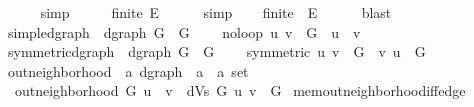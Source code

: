 \begin{isabellebody}
\ \ \ \ \isamarkupfalse%
\ simp\isanewline
\ \ \isamarkupfalse%
\ \isamarkupfalse%
\ {\isachardoublequoteopen}finite\ {\isacharquery}{\kern0pt}E{\isachardoublequoteclose}\isanewline
\ \ \ \ \isamarkupfalse%
\ simp\isanewline
\ \ \isamarkupfalse%
\ {\isachardoublequoteopen}finite\ {\isacharparenleft}{\kern0pt}{\isasymUnion}\ {\isacharquery}{\kern0pt}E{\isacharparenright}{\kern0pt}{\isachardoublequoteclose}\isanewline
\ \ \ \ \isamarkupfalse%
\ blast\isanewline
{}\isamarkupfalse%
%
\endisatagproof
{\isafoldproof}%
%
\isadelimproof
\isanewline
%
\endisadelimproof
\isanewline
{}\isamarkupfalse%
\ simple{\isacharunderscore}{\kern0pt}dgraph\ {\isacharequal}{\kern0pt}\ dgraph\ G\ \ G\ {\isacharplus}{\kern0pt}\isanewline
\ \ \ no{\isacharunderscore}{\kern0pt}loop{\isacharcolon}{\kern0pt}\ {\isachardoublequoteopen}{\isacharparenleft}{\kern0pt}u{\isacharcomma}{\kern0pt}\ v{\isacharparenright}{\kern0pt}\ {\isasymin}\ G\ {\isasymLongrightarrow}\ u\ {\isasymnoteq}\ v{\isachardoublequoteclose}\isanewline
\isanewline
{}\isamarkupfalse%
\ symmetric{\isacharunderscore}{\kern0pt}dgraph\ {\isacharequal}{\kern0pt}\ dgraph\ G\ \ G\ {\isacharplus}{\kern0pt}\isanewline
\ \ \ symmetric{\isacharcolon}{\kern0pt}\ {\isachardoublequoteopen}{\isacharparenleft}{\kern0pt}u{\isacharcomma}{\kern0pt}\ v{\isacharparenright}{\kern0pt}\ {\isasymin}\ G\ {\isasymlongleftrightarrow}\ {\isacharparenleft}{\kern0pt}v{\isacharcomma}{\kern0pt}\ u{\isacharparenright}{\kern0pt}\ {\isasymin}\ G{\isachardoublequoteclose}\isanewline
%
\isadeliminvisible
\isanewline
%
\endisadeliminvisible
%
\isataginvisible
{}\isamarkupfalse%
\ out{\isacharunderscore}{\kern0pt}neighborhood\ {\isacharcolon}{\kern0pt}{\isacharcolon}{\kern0pt}\ {\isachardoublequoteopen}{\isacharprime}{\kern0pt}a\ dgraph\ {\isasymRightarrow}\ {\isacharprime}{\kern0pt}a\ {\isasymRightarrow}\ {\isacharprime}{\kern0pt}a\ set{\isachardoublequoteclose}\ \isanewline
\ \ {\isachardoublequoteopen}out{\isacharunderscore}{\kern0pt}neighborhood\ G\ u\ {\isasymequiv}\ {\isacharbraceleft}{\kern0pt}v\ {\isasymin}\ dVs\ G{\isachardot}{\kern0pt}\ {\isacharparenleft}{\kern0pt}u{\isacharcomma}{\kern0pt}\ v{\isacharparenright}{\kern0pt}\ {\isasymin}\ G{\isacharbraceright}{\kern0pt}{\isachardoublequoteclose}\isanewline
\isanewline
{}\isamarkupfalse%
\ mem{\isacharunderscore}{\kern0pt}out{\isacharunderscore}{\kern0pt}neighborhood{\isacharunderscore}{\kern0pt}iff{\isacharunderscore}{\kern0pt}edge{\isacharcolon}{\kern0pt}\isanewline

\end{isabellebody}
